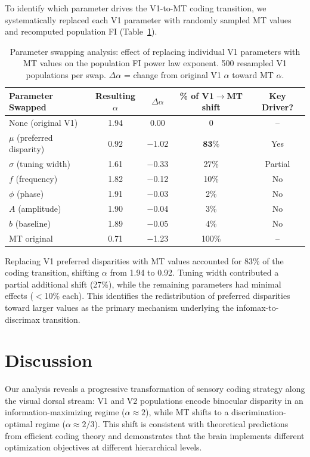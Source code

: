 \documentclass[11pt]{article}
\begin{document}
To identify which parameter drives the V1-to-MT coding transition, we systematically replaced each V1 parameter with randomly sampled MT values and recomputed population FI (Table~\ref{tab:swap}).

\begin{table}[H]
\centering
\caption{Parameter swapping analysis: effect of replacing individual V1 parameters with MT values on the population FI power law exponent. 500 resampled V1 populations per swap. $\Delta\alpha$ = change from original V1 $\alpha$ toward MT $\alpha$.}
\label{tab:swap}
\begin{tabular}{lcccc}
\toprule
Parameter Swapped & Resulting $\alpha$ & $\Delta\alpha$ & \% of V1$\to$MT shift & Key Driver? \\
\midrule
None (original V1) & 1.94 & 0.00 & 0 & -- \\
$\mu$ (preferred disparity) & $\mathbf{0.92}$ & $\mathbf{-1.02}$ & $\mathbf{83\%}$ & Yes \\
$\sigma$ (tuning width) & 1.61 & $-$0.33 & 27\% & Partial \\
$f$ (frequency) & 1.82 & $-$0.12 & 10\% & No \\
$\phi$ (phase) & 1.91 & $-$0.03 & 2\% & No \\
$A$ (amplitude) & 1.90 & $-$0.04 & 3\% & No \\
$b$ (baseline) & 1.89 & $-$0.05 & 4\% & No \\
MT original & 0.71 & $-$1.23 & 100\% & -- \\
\bottomrule
\end{tabular}
\end{table}

Replacing V1 preferred disparities with MT values accounted for 83\% of the coding transition, shifting $\alpha$ from 1.94 to 0.92. Tuning width contributed a partial additional shift (27\%), while the remaining parameters had minimal effects ($<$10\% each). This identifies the redistribution of preferred disparities toward larger values as the primary mechanism underlying the infomax-to-discrimax transition.

\section{Discussion}

Our analysis reveals a progressive transformation of sensory coding strategy along the visual dorsal stream: V1 and V2 populations encode binocular disparity in an information-maximizing regime ($\alpha \approx 2$), while MT shifts to a discrimination-optimal regime ($\alpha \approx 2/3$). This shift is consistent with theoretical predictions from efficient coding theory \citep{ganguli2012efficient, wei2015bayesian} and demonstrates that the brain implements different optimization objectives at different hierarchical levels.
\end{document}

